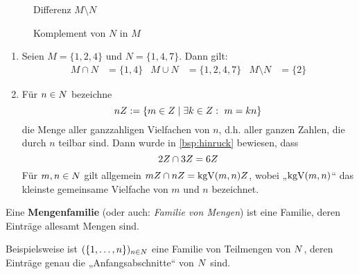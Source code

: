 \begin{defin}
\begin{figure}[ht]
\begin{minipage}{.48\textwidth}
\begin{tikzpicture}[scale=.75]
            \end{tikzpicture}
            \caption{Differenz $M\setminus N$}
        \end{minipage}
        \quad
        \begin{minipage}{.48\textwidth}
            \centering
            \caption{Komplement von $N$ in $M$}
        \end{minipage}
    \end{figure}
\end{defin}


\begin{bsp} \quad
    \begin{enumerate}
        \item Seien $ M = \{1, 2, 4\}$ und $N = \{1, 4, 7\}$. Dann gilt: 
	\begin{align*}
            M \cap N &= \{1, 4\} & M \cup N &= \{1, 2, 4, 7\} & M \setminus N &= \{2\}
	\end{align*}
        \item Für $n\in \N$ bezeichne
            \[ n\Z := \{ m\in \Z \mid \exists k\in \Z:\ m=kn \} \]
        die Menge aller ganzzahligen Vielfachen von $n$, d.h. aller ganzen Zahlen, die durch $n$ teilbar sind. Dann wurde in \cref{bsp:hinruck} bewiesen, dass
            \[ 2\Z \cap 3\Z = 6\Z \]
        Für $m,n\in \N$ gilt allgemein $m\Z\cap n\Z = \kgV(m,n)\Z$, wobei „$\kgV(m,n)$“ das kleinste gemeinsame Vielfache von $m$ und $n$ bezeichnet.
    \end{enumerate}
\end{bsp}


\begin{defin}[Mengenfamilie] 
    Eine \textbf{Mengenfamilie} (oder auch: \emph{Familie von Mengen}) ist eine Familie, deren Einträge allesamt Mengen sind.
\end{defin}


\begin{bsp}
    Beispielsweise ist $(\{1,\dots , n\})_{n\in \N}$ eine Familie von Teilmengen von $\N$, deren Einträge genau die „Anfangsabschnitte“ von $\N$ sind.
\end{bsp}


